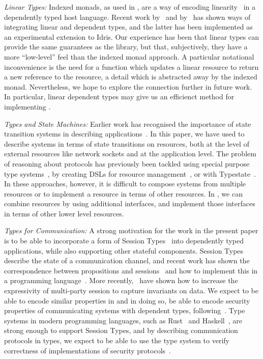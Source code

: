 
\emph{\textsf{Linear Types:}}
%
Indexed monads, as used in \states{}, are a way of encoding
linearity~\citep{wadler-linear,Abramsky1993} 
in a dependently typed host language. Recent work by~\citet{neelk2015}
and by~\citet{McBride2016} has shown ways of integrating linear and
dependent types, and the latter has been implemented as an experimental
extension to Idris.
Our experience has been that linear types can provide the same guarantees
as the \states{} library, but that, subjectively, they have a more ``low-level''
feel than the indexed monad approach. A particular notational inconvenience is
the need for a function which updates a linear resource to return a new 
reference to the resource, a detail which is abstracted away by the indexed
monad. Nevertheless, we hope to explore the connection further in future work.
In particular, linear dependent types may give us an efficienct
method for implementing \states{}.

\emph{\textsf{Types and State Machines:}}
%
Earlier work has recognised the importance of state transition systems
in describing applications~\citep{statecharts}.
%
In this paper, we have used \states{} to describe systems in terms
of state transitions on resources,
both at the level of external resources like network sockets and at
the application level.
The problem of reasoning about protocols has previously been
tackled using special purpose type systems~\citep{Walker2000}, by creating
DSLs for resource management~\citep{Brady2010a}, or with
Typestate~\citep{Aldrich2009,Strom1986}. In these approaches, however,
it is difficult to compose systems from multiple resources or to implement a
resource in terms of other resources.  In \states{}, we can combine resources
by using additional interfaces, and implement those interfaces in terms of
other lower level resources.

\emph{\textsf{Types for Communication:}}
%
A strong motivation for the work in the present paper is to be able to
incorporate a form of Session Types~\citep{Honda93,Honda08} into dependently
typed applications, while also supporting other stateful components.  
Session Types describe the state of a communication channel, 
and recent work has shown the correspondence between propositions and 
sessions~\citep{propositions-sessions} and how to implement this in a
programming language~\citep{Lindley2015}. 
More recently,~\citet{Toninho2016} have shown how to increase the
expressivity of multi-party session to capture invariants on data.
We expect
to be able to encode similar properties in \states{} and in doing so, be
able to encode security properties of communicating systems with
dependent types, following~\citep{Guenot2015}.
Type systems in modern programming languages, such as Rust~\citep{session-rust}
and Haskell~\citep{session-haskell}, are strong enough to support Session
Types, and by describing communication protocols in types, we expect to be able
to use the type system to verify correctness of implementations of security
protocols~\citep{gordon2003authenticity,sewell-tls}.


